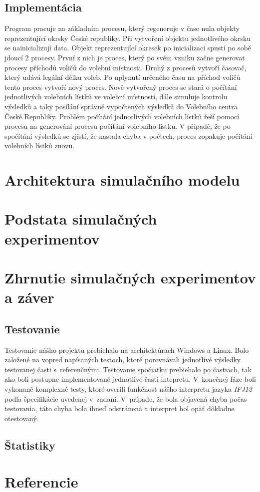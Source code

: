 \documentclass[12pt,a4paper,titlepage,final]{article}
\begin{document}
\subsection{Implementácia}
Program pracuje na základním procesu, který regeneruje v čase nula objekty reprezentující okrsky České republiky. Při vytvoření objektu jednotlivého okrsku se nainicializují data. Objekt reprezentující okresek po inicializaci spustí po sobě jdoucí 2 procesy. První z nich je proces, který po svém vzniku začne generovat procesy příchodů voličů do volební místnosti. Druhý z procesů vytvoří časovač, který udává legální délku voleb. Po uplynutí určeného času na příchod voličů tento proces vytvoří nový proces. Nově vytvořený proces se stará o počítání jednotlivých volebních lístků ve volební místnosti, dále simuluje kontrolu výsledků a taky posílání správně vypočtených výsledků do Volebního centra České Republiky. Problém počítání jednotlivých volebních lístků řeší pomocí procesu na generování procesu počítání volebního lístku. V případě, že po spočítání výsledků se zjistí, že nastala chyba v počtech, proces zopakuje počítání volebních lístků znovu. 




\section{Architektura simulačního modelu}
\newpage


\section{Podstata simulačných experimentov}

\section{Zhrnutie simulačných experimentov a záver}

\subsection{Testovanie}
Testovanie nášho projektu prebiehalo na architektúrach Windows a Linux. Bolo založené na vopred napísaných testoch, ktoré porovnávali jednotlivé výsledky testovanej časti s~referenčnými. Testovanie spočiatku prebiehalo po častiach, tak ako boli postupne implementované jednotlivé časti intepretu.
V~konečnej fáze boli vykonané komplexné testy, ktoré overili funkčnost nášho interpretu jazyka \emph{IFJ12} podľa špecifikácie uvedenej v~zadaní. V~prípade, že bola objavená chyba počas testovania, táto chyba bola ihneď odstránená a interpret bol opäť dôkladne otestovaný.


\subsection{Štatistiky}
\newpage


 
\newpage




\newpage

\section{Referencie}





\newpage
\end{document}
